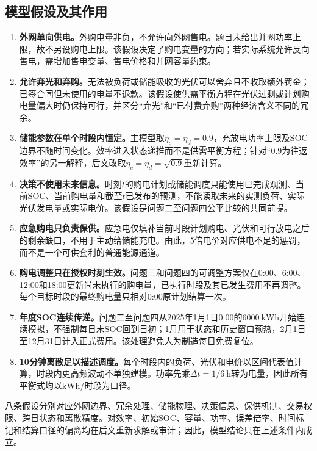 \documentclass[UTF8,12pt,a4paper]{ctexart}
\theoremstyle{remark}
\begin{document}
\subsection{模型假设及其作用}
\begin{enumerate}
\item \textbf{外网单向供电。}外购电量非负，不允许向外网售电。题目未给出并网功率上限，故不另设购电上限。该假设决定了购电变量的方向；若实际系统允许反向售电，需增加售电变量、售电价格和并网容量约束。
\item \textbf{允许弃光和弃购。}无法被负荷或储能吸收的光伏可以舍弃且不收取额外罚金；已签合同但未使用的电量不退款。该假设使供需平衡方程在光伏过剩或计划购电量偏大时仍保持可行，并区分“弃光”和“已付费弃购”两种经济含义不同的冗余。
\item \textbf{储能参数在单个时段内恒定。}主模型取$\eta_c=\eta_d=0.9$，充放电功率上限及SOC边界不随时间变化。效率进入状态递推而不是供需平衡方程；针对“0.9为往返效率”的另一解释，后文改取$\eta_c=\eta_d=\sqrt{0.9}$重新计算。
\item \textbf{决策不使用未来信息。}时刻$t$的购电计划或储能调度只能使用已完成观测、当前SOC、当前购电量和截至$t$已发布的预测，不能读取未来的实测负荷、实际光伏发电量或实际电价。该假设是问题二至问题四公平比较的共同前提。
\item \textbf{应急购电只负责保供。}应急电仅填补当前时段计划购电、光伏和可行放电之后的剩余缺口，不用于主动给储能充电。由此，5倍电价对应供电不足的惩罚，而不是一个可供套利的普通能源通道。
\item \textbf{购电调整只在授权时刻生效。}问题三和问题四的可调整方案仅在0:00、6:00、12:00和18:00更新尚未执行的购电量，已执行时段及其已发生费用不再调整。每个目标时段的最终购电量只相对0:00原计划结算一次。
\item \textbf{年度SOC连续传递。}问题二至问题四从2025年1月1日0:00的$6000\ \mathrm{kWh}$开始连续模拟，不强制每日末SOC回到日初；1月用于状态和历史窗口预热，2月1日至12月31日计入正式费用。该处理避免人为制造每日免费复位。
\item \textbf{10分钟离散足以描述调度。}每个时段内的负荷、光伏和电价以区间代表值计算，时段内更高频波动不单独建模。功率先乘$\Delta t=1/6\ \mathrm h$转为电量，因此所有平衡式均以$\mathrm{kWh}$/时段为口径。
\end{enumerate}

八条假设分别对应外网边界、冗余处理、储能物理、决策信息、保供机制、交易权限、跨日状态和离散精度。对效率、初始SOC、容量、功率、误差倍率、时间标记和结算口径的偏离均在后文重新求解或审计；因此，模型结论只在上述条件内成立。
\end{document}
